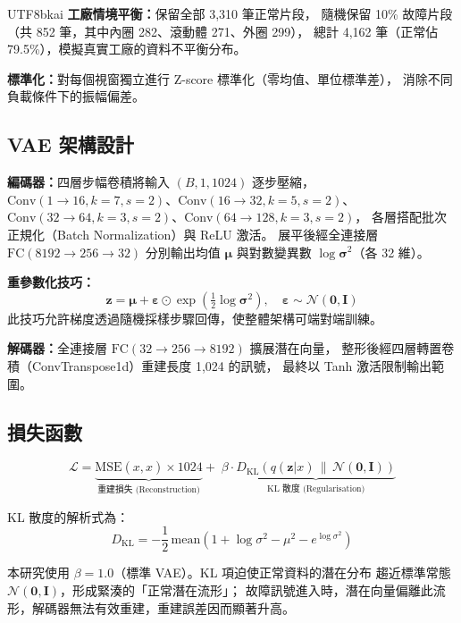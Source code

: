 \documentclass[conference]{IEEEtran}
\begin{document}
\begin{CJK}{UTF8}{bkai}
\textbf{工廠情境平衡：}保留全部 3,310 筆正常片段，
隨機保留 10\% 故障片段（共 852 筆，其中內圈 282、滾動體 271、外圈 299），
總計 4,162 筆（正常佔 79.5\%），模擬真實工廠的資料不平衡分布。

\textbf{標準化：}對每個視窗獨立進行 Z-score 標準化（零均值、單位標準差），
消除不同負載條件下的振幅偏差。

\subsection{VAE 架構設計}

\textbf{編碼器：}四層步幅卷積將輸入 $(B,1,1024)$ 逐步壓縮，
$\text{Conv}(1\to16, k=7, s=2)$、$\text{Conv}(16\to32, k=5, s=2)$、
$\text{Conv}(32\to64, k=3, s=2)$、$\text{Conv}(64\to128, k=3, s=2)$，
各層搭配批次正規化（Batch Normalization）與 ReLU 激活。
展平後經全連接層 $\text{FC}(8192\to256\to32)$ 分別輸出均值 $\boldsymbol{\mu}$
與對數變異數 $\log\boldsymbol{\sigma}^2$（各 32 維）。

\textbf{重參數化技巧：}
\begin{equation}
  \mathbf{z} = \boldsymbol{\mu} + \boldsymbol{\varepsilon} \odot
  \exp\!\left(\tfrac{1}{2}\log\boldsymbol{\sigma}^2\right),\quad
  \boldsymbol{\varepsilon} \sim \mathcal{N}(\mathbf{0},\mathbf{I})
\end{equation}
此技巧允許梯度透過隨機採樣步驟回傳，使整體架構可端對端訓練。

\textbf{解碼器：}全連接層 $\text{FC}(32\to256\to8192)$ 擴展潛在向量，
整形後經四層轉置卷積（ConvTranspose1d）重建長度 1,024 的訊號，
最終以 Tanh 激活限制輸出範圍。

\subsection{損失函數}

\begin{equation}
  \mathcal{L} =
  \underbrace{\mathrm{MSE}(x,\hat{x})\times 1024}_{\text{重建損失 (Reconstruction)}}
  +\;\beta\cdot
  \underbrace{D_{\mathrm{KL}}\!\left(q(\mathbf{z}|x)
  \,\|\,\mathcal{N}(\mathbf{0},\mathbf{I})\right)}_{\text{KL 散度 (Regularisation)}}
\end{equation}

KL 散度的解析式為：
\begin{equation}
  D_{\mathrm{KL}} = -\frac{1}{2}\,\mathrm{mean}\!\left(
  1 + \log\sigma^2 - \mu^2 - e^{\log\sigma^2}\right)
\end{equation}

本研究使用 $\beta=1.0$（標準 VAE）。KL 項迫使正常資料的潛在分布
趨近標準常態 $\mathcal{N}(\mathbf{0},\mathbf{I})$，形成緊湊的「正常潛在流形」；
故障訊號進入時，潛在向量偏離此流形，解碼器無法有效重建，重建誤差因而顯著升高。


\end{CJK}
\end{document}

